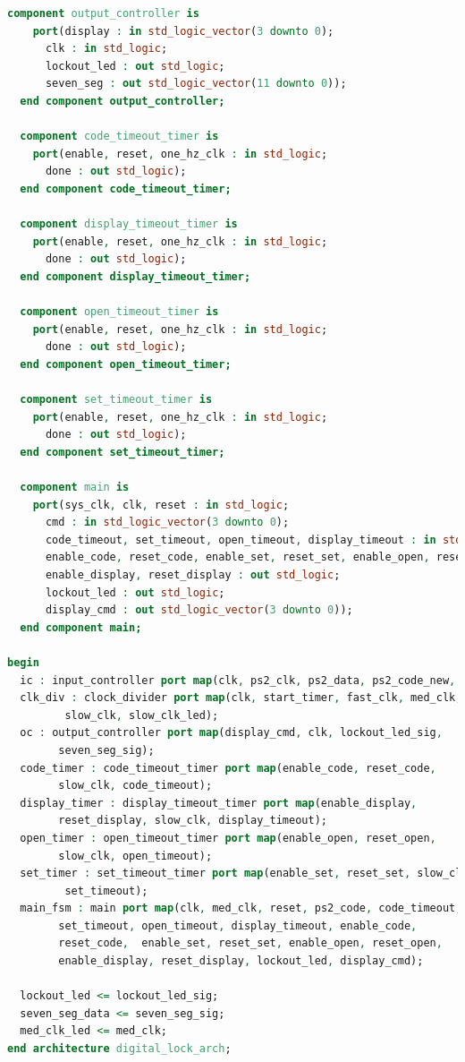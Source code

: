 \documentclass[11pt]{article}
\begin{document}
\begin{appendices}
\begin{lstlisting}[language=VHDL]
  component output_controller is
    port(display : in std_logic_vector(3 downto 0);
      clk : in std_logic;
      lockout_led : out std_logic;
      seven_seg : out std_logic_vector(11 downto 0));
  end component output_controller;

  component code_timeout_timer is
    port(enable, reset, one_hz_clk : in std_logic;
      done : out std_logic);
  end component code_timeout_timer;

  component display_timeout_timer is
    port(enable, reset, one_hz_clk : in std_logic;
      done : out std_logic);
  end component display_timeout_timer;

  component open_timeout_timer is
    port(enable, reset, one_hz_clk : in std_logic;
      done : out std_logic);
  end component open_timeout_timer;

  component set_timeout_timer is
    port(enable, reset, one_hz_clk : in std_logic;
      done : out std_logic);
  end component set_timeout_timer;

  component main is
    port(sys_clk, clk, reset : in std_logic;
      cmd : in std_logic_vector(3 downto 0);
      code_timeout, set_timeout, open_timeout, display_timeout : in std_logic;
      enable_code, reset_code, enable_set, reset_set, enable_open, reset_open,
      enable_display, reset_display : out std_logic;
      lockout_led : out std_logic;
      display_cmd : out std_logic_vector(3 downto 0));
  end component main;

begin
  ic : input_controller port map(clk, ps2_clk, ps2_data, ps2_code_new, ps2_code);
  clk_div : clock_divider port map(clk, start_timer, fast_clk, med_clk,
  		 slow_clk, slow_clk_led);
  oc : output_controller port map(display_cmd, clk, lockout_led_sig, 
  		seven_seg_sig);
  code_timer : code_timeout_timer port map(enable_code, reset_code, 
  		slow_clk, code_timeout);
  display_timer : display_timeout_timer port map(enable_display, 
  		reset_display, slow_clk, display_timeout);
  open_timer : open_timeout_timer port map(enable_open, reset_open, 
  		slow_clk, open_timeout);
  set_timer : set_timeout_timer port map(enable_set, reset_set, slow_clk,
  		 set_timeout);
  main_fsm : main port map(clk, med_clk, reset, ps2_code, code_timeout, 
  		set_timeout, open_timeout, display_timeout, enable_code,
  		reset_code,  enable_set, reset_set, enable_open, reset_open, 
  		enable_display, reset_display, lockout_led, display_cmd);

  lockout_led <= lockout_led_sig;
  seven_seg_data <= seven_seg_sig;
  med_clk_led <= med_clk;
end architecture digital_lock_arch;
\end{lstlisting}


\end{appendices}
\end{document}
